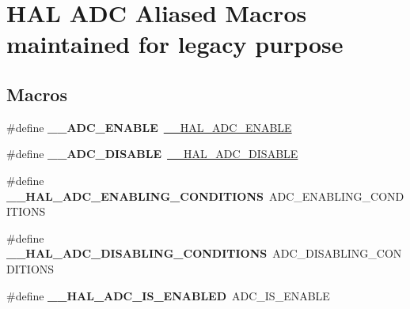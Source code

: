 \hypertarget{group___h_a_l___a_d_c___aliased___macros}{}\section{H\+AL A\+DC Aliased Macros maintained for legacy purpose}
\label{group___h_a_l___a_d_c___aliased___macros}
\subsection*{Macros}
\begin{DoxyCompactItemize}
\item 
\#define {\bfseries \+\_\+\+\_\+\+A\+D\+C\+\_\+\+E\+N\+A\+B\+LE}~\hyperlink{group___a_d_c___exported___macros_gaadf16862da7593def189559423c287f4}{\+\_\+\+\_\+\+H\+A\+L\+\_\+\+A\+D\+C\+\_\+\+E\+N\+A\+B\+LE}\hypertarget{group___h_a_l___a_d_c___aliased___macros_gade2e452da8695130dbc0b8b516ec16ff}{}\label{group___h_a_l___a_d_c___aliased___macros_gade2e452da8695130dbc0b8b516ec16ff}

\item 
\#define {\bfseries \+\_\+\+\_\+\+A\+D\+C\+\_\+\+D\+I\+S\+A\+B\+LE}~\hyperlink{group___a_d_c___exported___macros_ga8afd5963c41c0a30c5cf1fec5c5710b3}{\+\_\+\+\_\+\+H\+A\+L\+\_\+\+A\+D\+C\+\_\+\+D\+I\+S\+A\+B\+LE}\hypertarget{group___h_a_l___a_d_c___aliased___macros_ga6a8dfa9e047c1ac8f70d2fe3ae3fd4dc}{}\label{group___h_a_l___a_d_c___aliased___macros_ga6a8dfa9e047c1ac8f70d2fe3ae3fd4dc}

\item 
\#define {\bfseries \+\_\+\+\_\+\+H\+A\+L\+\_\+\+A\+D\+C\+\_\+\+E\+N\+A\+B\+L\+I\+N\+G\+\_\+\+C\+O\+N\+D\+I\+T\+I\+O\+NS}~A\+D\+C\+\_\+\+E\+N\+A\+B\+L\+I\+N\+G\+\_\+\+C\+O\+N\+D\+I\+T\+I\+O\+NS\hypertarget{group___h_a_l___a_d_c___aliased___macros_gaf09405aa65148ec822984b2d81992596}{}\label{group___h_a_l___a_d_c___aliased___macros_gaf09405aa65148ec822984b2d81992596}

\item 
\#define {\bfseries \+\_\+\+\_\+\+H\+A\+L\+\_\+\+A\+D\+C\+\_\+\+D\+I\+S\+A\+B\+L\+I\+N\+G\+\_\+\+C\+O\+N\+D\+I\+T\+I\+O\+NS}~A\+D\+C\+\_\+\+D\+I\+S\+A\+B\+L\+I\+N\+G\+\_\+\+C\+O\+N\+D\+I\+T\+I\+O\+NS\hypertarget{group___h_a_l___a_d_c___aliased___macros_ga758e02a9d4e37528e42ff60eff476cbf}{}\label{group___h_a_l___a_d_c___aliased___macros_ga758e02a9d4e37528e42ff60eff476cbf}

\item 
\#define {\bfseries \+\_\+\+\_\+\+H\+A\+L\+\_\+\+A\+D\+C\+\_\+\+I\+S\+\_\+\+E\+N\+A\+B\+L\+ED}~A\+D\+C\+\_\+\+I\+S\+\_\+\+E\+N\+A\+B\+LE\hypertarget{group___h_a_l___a_d_c___aliased___macros_ga2c78554d5c9d8311297ea8fb01866309}{}\label{group___h_a_l___a_d_c___aliased___macros_ga2c78554d5c9d8311297ea8fb01866309}


\end{DoxyCompactItemize}
